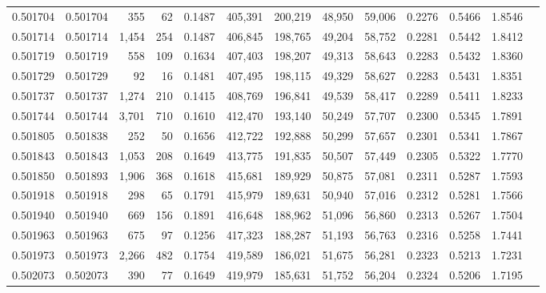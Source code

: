 \begin{tabular}{rrrrrrrrrrrrr}
0.501704 & 0.501704 &   355 &    62 &                                     0.1487 & 405,391 & 200,219 &  48,950 &  59,006 & 0.2276 & 0.5466 & 1.8546 \\
0.501714 & 0.501714 & 1,454 &   254 &                                     0.1487 & 406,845 & 198,765 &  49,204 &  58,752 & 0.2281 & 0.5442 & 1.8412 \\
0.501719 & 0.501719 &   558 &   109 &                                     0.1634 & 407,403 & 198,207 &  49,313 &  58,643 & 0.2283 & 0.5432 & 1.8360 \\
0.501729 & 0.501729 &    92 &    16 &                                     0.1481 & 407,495 & 198,115 &  49,329 &  58,627 & 0.2283 & 0.5431 & 1.8351 \\
0.501737 & 0.501737 & 1,274 &   210 &                                     0.1415 & 408,769 & 196,841 &  49,539 &  58,417 & 0.2289 & 0.5411 & 1.8233 \\
0.501744 & 0.501744 & 3,701 &   710 &                                     0.1610 & 412,470 & 193,140 &  50,249 &  57,707 & 0.2300 & 0.5345 & 1.7891 \\
0.501805 & 0.501838 &   252 &    50 &                                     0.1656 & 412,722 & 192,888 &  50,299 &  57,657 & 0.2301 & 0.5341 & 1.7867 \\
0.501843 & 0.501843 & 1,053 &   208 &                                     0.1649 & 413,775 & 191,835 &  50,507 &  57,449 & 0.2305 & 0.5322 & 1.7770 \\
0.501850 & 0.501893 & 1,906 &   368 &                                     0.1618 & 415,681 & 189,929 &  50,875 &  57,081 & 0.2311 & 0.5287 & 1.7593 \\
0.501918 & 0.501918 &   298 &    65 &                                     0.1791 & 415,979 & 189,631 &  50,940 &  57,016 & 0.2312 & 0.5281 & 1.7566 \\
0.501940 & 0.501940 &   669 &   156 &                                     0.1891 & 416,648 & 188,962 &  51,096 &  56,860 & 0.2313 & 0.5267 & 1.7504 \\
0.501963 & 0.501963 &   675 &    97 &                                     0.1256 & 417,323 & 188,287 &  51,193 &  56,763 & 0.2316 & 0.5258 & 1.7441 \\
0.501973 & 0.501973 & 2,266 &   482 &                                     0.1754 & 419,589 & 186,021 &  51,675 &  56,281 & 0.2323 & 0.5213 & 1.7231 \\
0.502073 & 0.502073 &   390 &    77 &                                     0.1649 & 419,979 & 185,631 &  51,752 &  56,204 & 0.2324 & 0.5206 & 1.7195 \\

\end{tabular}
